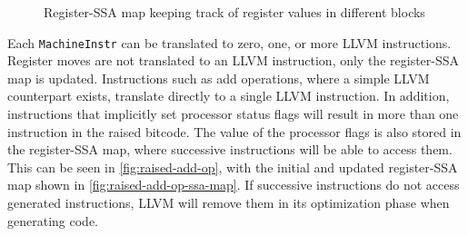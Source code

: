 \begin{figure}[htpb]
    \centering
    \caption{Register-SSA map keeping track of register values in different blocks}
    \label{fig:reg-ssa-map}
\end{figure}

Each \texttt{MachineInstr} can be translated to zero, one, or more LLVM instructions.
Register moves are not translated to an LLVM instruction, only the register-SSA map is updated.
Instructions such as add operations, where a simple LLVM counterpart exists, translate directly to a single LLVM instruction.
In addition, instructions that implicitly set processor status flags will result in more than one instruction in the raised bitcode.
The value of the processor flags is also stored in the register-SSA map, where successive instructions will be able to access them.
This can be seen in \cref{fig:raised-add-op}, with the initial and updated register-SSA map shown in \cref{fig:raised-add-op-ssa-map}.
If successive instructions do not access generated instructions, LLVM will remove them in its optimization phase when generating code.


